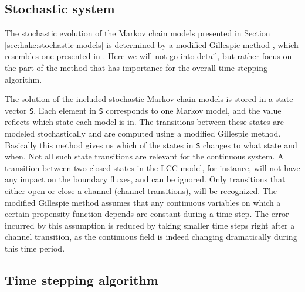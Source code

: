 \subsection{Stochastic system}

\label{sec:hake:stochastic-system}
    The stochastic evolution of the
Markov chain models presented in Section
\ref{sec:hake:stochastic-models} is determined by a modified Gillespie
method \citep{Gillespie1977}, which resembles one presented in
\citet{RudigerShuaiHuisingaEtAl2007}. Here we will not go into detail,
but rather focus on the part of the method that has importance for the
overall time stepping algorithm.

The solution of the included stochastic Markov chain models is stored
in a state vector \texttt{S}. Each element in \texttt{S} corresponds
to one Markov model, and the value reflects which state each model is
in. The transitions between these states are modeled stochastically
and are computed using a modified Gillespie method. Basically this
method gives us which of the states in \texttt{S} changes to what
state and when. Not all such state transitions are relevant for the
continuous system. A transition between two closed states in the LCC
model, for instance, will not have any impact on the boundary fluxes,
and can be ignored. Only transitions that either open or close a
channel (channel transitions), will be recognized. The modified
Gillespie method assumes that any continuous variables on which a
certain propensity function depends are constant during a time
step. The error incurred by this assumption is reduced by taking
smaller time steps right after a channel transition, as the continuous
field is indeed changing dramatically during this time period.

\subsection{Time stepping algorithm}

